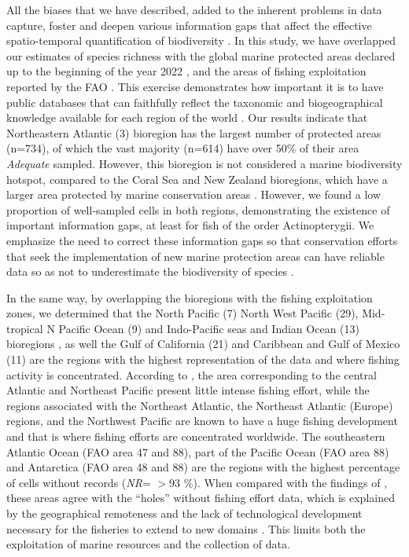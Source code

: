 \documentclass[12pt,authoryear]{elsarticle}
\begin{document}
All the biases that we have described, added to the inherent problems in data capture, foster and deepen various information gaps that affect the effective spatio-temporal quantification of biodiversity \citep{magurran2011}. In this study, we have overlapped our estimates of species richness with the global marine protected areas declared up to the beginning of the year 2022 \citep{wcmc2022}, and the areas of fishing exploitation reported by the FAO \citep{fao2014}. This exercise demonstrates how important it is to have public databases that can faithfully reflect the taxonomic and biogeographical knowledge available for each region of the world \citep{pelayo2018}. Our results indicate that Northeastern Atlantic (3) bioregion has the largest number of protected areas (n=734), of which the vast majority (n=614) have over 50\% of their area \textit{Adequate} sampled. However, this bioregion is not considered a marine biodiversity hotspot, compared to the Coral Sea and New Zealand bioregions, which have a larger area protected by marine conservation areas \citep{ramirez2017climate}. However, we found a low proportion of well-sampled cells in both regions, demonstrating the existence of important information gaps, at least for fish of the order Actinopterygii. We emphasize the need to correct these information gaps so that conservation efforts that seek the implementation of new marine protection areas can have reliable data so as not to underestimate the biodiversity of species \citep{sala2021}.

In the same way, by overlapping the bioregions with the fishing exploitation zones, we determined that the North Pacific (7) North West Pacific (29), Mid-tropical N Pacific Ocean (9) and Indo-Pacific seas and Indian Ocean (13) bioregions , as well the Gulf of California (21) and Caribbean and Gulf of Mexico (11) are the regions with the highest representation of the data and where fishing activity is concentrated. According to \citep{kroodsma2018}, the area corresponding to the central Atlantic and Northeast Pacific present little intense fishing effort, while the regions associated with the Northeast Atlantic, the Northeast Atlantic (Europe) regions, and the Northwest Pacific are known to have a huge fishing development and that is where fishing efforts are concentrated worldwide. The southeastern Atlantic Ocean (FAO area 47 and 88), part of the Pacific Ocean (FAO area 88) and Antarctica (FAO area 48 and 88) are the regions with the highest percentage of cells without records (\textit{NR}= \(>\)93 \%). When compared with the findings of \citep{kroodsma2018}, these areas agree with the “holes” without fishing effort data, which is explained by the geographical remoteness and the lack of technological development necessary for the fisheries to extend to new domains \citep{visalli2020}. This limits both the exploitation of marine resources and the collection of data.
\end{document}
